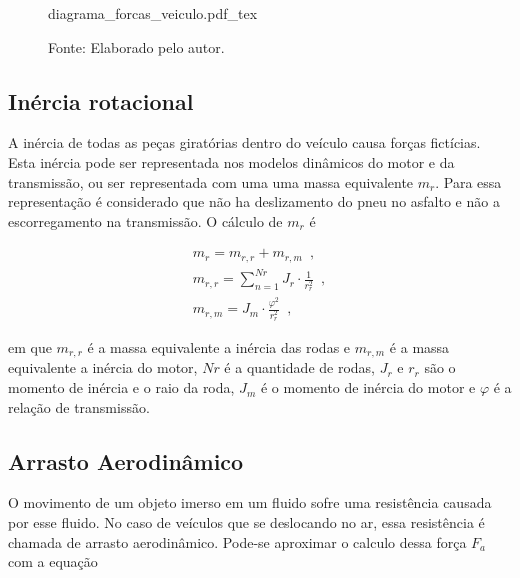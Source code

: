 \begin{figure}[h]
	\centering
	\caption{Diagrama de forças de um veículo em movimento}
	\label{fig:diag_forcas_veiculo}
	\begin{normalsize}
		{diagrama_forcas_veiculo.pdf_tex}
	\end{normalsize}
	\caption*{\footnotesize Fonte: Elaborado pelo autor.}
\end{figure}

\subsection{Inércia rotacional}

A inércia de todas as peças giratórias dentro do veículo causa forças fictícias. 
Esta inércia pode ser representada nos modelos dinâmicos do motor e da transmissão, ou ser representada com uma uma massa equivalente $m_r$.
Para essa representação é considerado que não ha deslizamento do pneu no asfalto e não a escorregamento na transmissão. O cálculo de $m_r$ é 

\begin{subequations}
	\label{eq:mr}
	\begin{align}
		m_r = m_{r,r} + m_{r,m} \enspace, \label{eq:mr1} \\
		m_{r,r} = \sum_{n=1}^{Nr} J_r \cdot \frac{1}{r_r^2} \enspace, \label{eq:mr2} \\
		m_{r,m} = J_m \cdot \frac{\varphi^2}{r_r^2} \enspace, \label{eq:mr3}
	\end{align}
\end{subequations}

em que $m_{r,r}$ é a massa equivalente a inércia das rodas e $m_{r,m}$ é a massa equivalente a inércia do motor, $Nr$ é a quantidade de rodas, 
$J_r$ e $r_r$ são o momento de inércia e o raio da roda, $J_m$ é o momento de inércia do motor e 
$\varphi$ é a relação de transmissão.\cite{book:guzzella2012vehicle}

\subsection{Arrasto Aerodinâmico}
\label{subsec:arrasto_aerodinamico}

O movimento de um objeto imerso em um fluido sofre uma resistência causada por esse fluido. No
caso de veículos que se deslocando no ar, essa
resistência é chamada de arrasto aerodinâmico.
Pode-se aproximar o calculo dessa força $F_{a}$ com a equação

